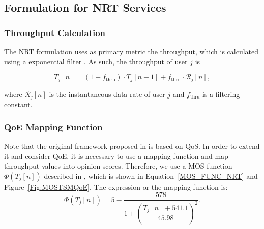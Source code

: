 \documentclass[12pt]{article}
\newcommand{\FigRef}[1]{Figure~\ref{#1}}
\newcommand{\EqRef}[1]{Equation~\ref{#1}}
\begin{document}
\subsection{Formulation for NRT Services}
\label{Sec:FormNRT}
%
\subsubsection{Throughput Calculation}
\label{Sec:THRU}
The \ac{NRT} formulation uses as primary metric the throughput, which is calculated using a exponential filter \cite{UFC40_WP2_TR_02_JSM}. As such, the throughput of user $j$ is

\begin{equation}
\label{Eq:ThroughputCalculation}
T_{j}\left[n\right] = \left(1 - f_{\mathrm{thru}}\right) \cdot T_{j}\left[n-1\right] + f_{\mathrm{thru}} \cdot \mathcal{R}_j[n],
\end{equation}

where $\mathcal{R}_j[n]$ is the instantaneous data rate of user $j$ and $f_{\mathrm{thru}}$ is a filtering constant.

\subsubsection{QoE Mapping Function}
Note that the original framework proposed in \cite{Rodrigues2014_Wiley} is based on \ac{QoS}. In order to extend it and consider \ac{QoE}, it is necessary to use a mapping function and map throughput values into opinion scores. Therefore, we use a \ac{MOS} function $\Phi(T_j [n])$ described in \cite{Poncela2014}, which is shown in \EqRef{MOS_FUNC_NRT} and \FigRef{Fig:MOSTSMQoE}. The expression or the mapping function is:
% 
\begin{equation}\label{MOS_FUNC_NRT}
\Phi\left(T_j[n]\right)= 5 - \frac{578}{1+\left(\dfrac{T_j[n] + 541.1}{45.98}\right)^{2}}.        
\end{equation}
\end{document}
